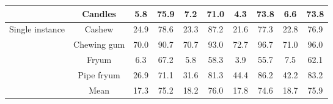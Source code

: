\documentclass[runningheads]{llncs}
\begin{document}
\begin{table*}[!ht]
{\begin{tabular}{cc|cccc|cccc}
    \multicolumn{1}{c|}{}                                    & Candles     & 5.8   & 75.9                        & 7.2         & 71.0        & 4.3   & 73.8                        & 6.6        & 73.8        \\ \hline
    \multicolumn{1}{c|}{\multirow{4}{*}{Single instance}}    & Cashew      & 24.9  & 78.6                        & 23.3        & 87.2        & 21.6  & 77.3                        & 22.8       & 76.9        \\
    \multicolumn{1}{c|}{}                                    & Chewing gum & 70.0  & 90.7                        & 70.7        & 93.0        & 72.7  & 96.7                        & 71.0       & 96.0        \\
    \multicolumn{1}{c|}{}                                    & Fryum       & 6.3   & 67.2                        & 5.8         & 58.3        & 3.9   & 55.7                        & 7.5        & 62.1        \\
    \multicolumn{1}{c|}{}                                    & Pipe fryum  & 26.9  & 71.1                        & 31.6        & 81.3        & 44.4  & 86.2                        & 42.2       & 83.2        \\ \hline
    \multicolumn{1}{c|}{}                                    & Mean        & 17.3  & 75.2                        & 18.2        & 76.0        & 17.8  & 74.6                        & 18.7       & 75.9        \\ \hline
    \end{tabular}}
\end{table*}
\end{document}
